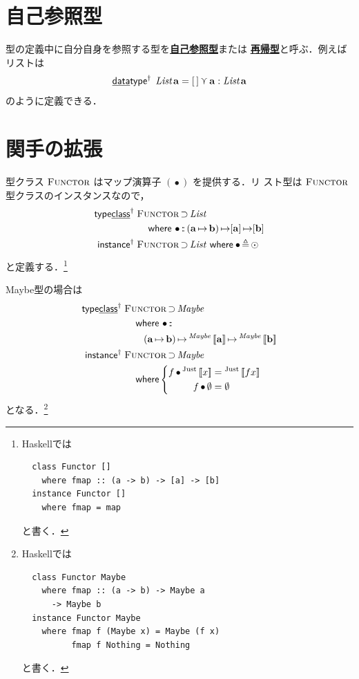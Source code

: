 \documentclass[a5paper,twoside,fleqn]{jsbook}
\def\[{\left[\!\left[}
\def\]{\right]\!\right]}
\newcommand{\programminglanguage}[1]{\textsf{#1}}
\newcommand{\haskell}{\programminglanguage{Haskell}}
\newcommand{\keyword}[1]{{\underline{\textbf{#1}}}}
\newcommand{\mKeyword}[1]{\mathsf{#1}} %
\newcommand{\mKeywordUnderline}[1]{\text{\underline{\textsf{#1}}}} %
\newcommand{\mDataTypeKeyword}{\mKeywordUnderline{data}\mKeyword{type}}
\newcommand{\mInstanceKeyword}{\mKeyword{instance}}
\newcommand{\mTypeClassKeyword}{\mKeyword{type}\mKeywordUnderline{class}}
\newcommand{\mWhereKeyword}{\mKeyword{where}}
\DeclareMathOperator{\mDataTypeParametric}{\mDataTypeKeyword^\dagger}
\DeclareMathOperator{\mInstanceParametric}{\mInstanceKeyword^{\dagger}}
\DeclareMathOperator{\mSuperSet}{\supset}
\DeclareMathOperator{\mTypeClassParametric}{\mTypeClassKeyword^\dagger}
\DeclareMathOperator{\mWhere}{\mWhereKeyword}
\newcommand{\mEmptyList}{{[\,]}}
\newcommand{\mNothing}{\emptyset}
\DeclareMathOperator{\mIn}{{:\!:}}
\DeclareMathOperator{\mLetEq}{\triangleq}
\DeclareMathOperator{\mMap}{\bullet}
\DeclareMathOperator{\mMapList}{\odot}
\DeclareMathOperator{\mMapsTo}{\mapsto}
\DeclareMathOperator{\mValueOr}{\curlyvee}
\newcommand{\mType}[1]{\mathbf{#1}}
\newcommand{\mListType}[1]{[\mType{#1}]}
\newcommand{\mGenericTypeAssemble}[2]{{}^{\mTypeConstructor{#1}}\[\mType{#2}\]}
\newcommand{\mMaybeType}[1]{\mGenericTypeAssemble{Maybe}{#1}}
\newcommand{\mTypeConstructor}[1]{\textit{#1}}
\DeclareMathOperator{\mListTypeConstructor}{\mTypeConstructor{List}}
\DeclareMathOperator{\mMaybeTypeConstructor}{\mTypeConstructor{Maybe}}
\newcommand{\mGenericValueConstructor}[1]{\mathrm{#1}}
\newcommand{\mGenericWith}[2]{{}^\mGenericValueConstructor{#1}\[#2\]}
\newcommand{\mJustWith}[1]{\mGenericWith{Just}{#1}}
\newcommand{\mGenericTypeClass}[1]{\textsc{#1}} %
\newcommand{\mFunctorTypeClass}{\mGenericTypeClass{Functor}}
\newcommand{\mProj}[2]{#1\mMapsTo#2}
\newcommand{\mWhereIs}[2]{\mathbin{\mWhereKeyword}#1\mLetEq#2}
\begin{document}
\section{自己参照型}

型の定義中に自分自身を参照する型を\keyword{自己参照型}または
\keyword{再帰型}と呼ぶ．例えばリストは
\begin{equation}
\mDataTypeParametric\;\mListTypeConstructor\mType{a}=\mEmptyList\mValueOr\mType{a}:\mListTypeConstructor\mType{a}
\end{equation}
のように定義できる．

\section{関手の拡張}

型クラス $\mFunctorTypeClass$ はマップ演算子 $(\mMap)$ を提供する．リ
スト型は $\mFunctorTypeClass$ 型クラスのインスタンスなので，
\begin{align}
\mTypeClassParametric\;
&\mFunctorTypeClass\mSuperSet\mListTypeConstructor\nonumber\\
&\quad\mWhere{}
\mMap\mIn{}\mProj{(\mProj{\mType{a}}{\mType{b}})}{\mProj{\mListType{a}}{\mListType{b}}}\\
\mInstanceParametric\;
&\mFunctorTypeClass\mSuperSet\mListTypeConstructor{}\mWhereIs{\mMap}{\mMapList}
\end{align}
と定義する．\footnote{\haskell では
\begin{verbatim}
  class Functor []
    where fmap :: (a -> b) -> [a] -> [b]
  instance Functor []
    where fmap = map
\end{verbatim}
と書く．}

Maybe型の場合は
\begin{align}
\mTypeClassParametric\;
&\mFunctorTypeClass\mSuperSet\mMaybeTypeConstructor\nonumber\\
&\quad\mWhere{}\mMap\mIn{}\nonumber\\
&\qquad\mProj{(\mProj{\mType{a}}{\mType{b}})}{\mProj{\mMaybeType{a}}{\mMaybeType{b}}}\\
\mInstanceParametric\;
&\mFunctorTypeClass\mSuperSet\mMaybeTypeConstructor\nonumber\\
&\quad\mWhere
\left\{
\begin{aligned}
f\mMap\mJustWith{x}&=\mJustWith{fx}\\
f\mMap\mNothing&=\mNothing
\end{aligned}
\right.
\end{align}
となる．\footnote{\haskell では
\begin{verbatim}
  class Functor Maybe
    where fmap :: (a -> b) -> Maybe a
      -> Maybe b
  instance Functor Maybe
    where fmap f (Maybe x) = Maybe (f x)
          fmap f Nothing = Nothing
\end{verbatim}
と書く．}
\end{document}

